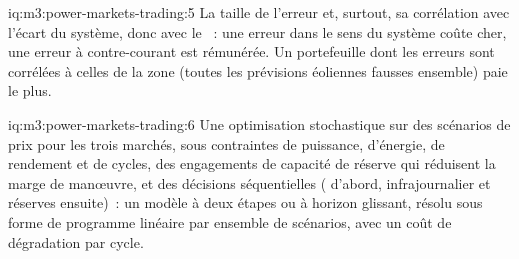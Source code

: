 \begin{solution}{iq:m3:power-markets-trading:5}
La taille de l'erreur et, surtout, sa corrélation avec l'écart du système, donc avec le
~: une erreur dans le sens du système coûte cher, une erreur à contre-courant est rémunérée. Un
portefeuille dont les erreurs sont corrélées à celles de la zone (toutes les prévisions éoliennes fausses ensemble) paie le plus.
\end{solution}

\begin{solution}{iq:m3:power-markets-trading:6}
Une optimisation stochastique sur des scénarios de prix pour les trois marchés, sous contraintes de puissance,
d'énergie, de rendement et de cycles, des engagements de capacité de réserve qui réduisent la marge de manœuvre, et
des décisions séquentielles ( d'abord, infrajournalier et réserves ensuite)~: un modèle à deux étapes ou
à horizon glissant, résolu sous forme de programme linéaire par ensemble de scénarios, avec un coût de dégradation par cycle.
\end{solution}
